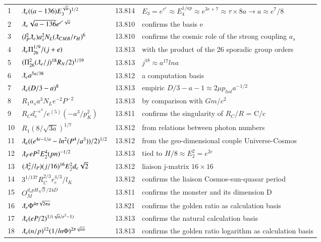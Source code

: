 \documentclass[a4paper,9pt]{article}
\begin{document}
\begin{appendix}
\begin{table}
\begin{tabular}{llll}
   1 & $\lambdabar_{e} ((a-136)E_3^{\sqrt a})^{1/2}$ & 13.814 & $E_3 = e^{e^e} \approx E_4^{1/ap} \approx e^{3e+7}\approx \tau \times 8a \rightarrow a\approx e^7/8$ \\
   2 & $ \lambdabar_{e} \sqrt{a -136} e^{e^e \sqrt a}$ & 13.810 & confirms the basis e \\
   3 & $(l_P^2 \lambdabar_{e})a_s^2 N_L (\lambdabar_{CMB}/r_H)^6$ & 13.810 & confirms the cosmic role of the strong coupling $a_s$ \\
   4 & $\lambdabar_{e} \Pi_{26}^{1/9}/(j+e)$ & 13.813 & with the product of the 26 sporadic group orders\\
   5 & $(\Pi_{26}^2(\lambdabar_e/j)^{18}R_N/2)^{1/19}$ & 13.813 & $j^{18} \approx a^{17} lna$\\
   6 & $\lambdabar_{e} a^{5a/38}$ & 13.812 & a computation basis\\
  7 & $\lambdabar_{e} (D/3 - a)^8$ & 13.813 & empiric $D/3 -a -1 \approx 2\mu p_{hol}a^{-1/2}$\\ 
   8 & $R_1 a_s a^3 N_L e^{-2}P^{-2}$ & 13.813 & by comparison with $Gm/c^2$\\
   9 & $R_C d_e^{-e^3}/e^{(5)}(-a^3/p_K^2)$ & 13.811 & confirms the singularity of $R_C/R$ = C/c\\
  10 & $R_1 (8/\sqrt{3a})^{1/7}$ & 13.812 & from relations between photon numbers \\
   11 & $\lambdabar_{e} ((e^{4e-1/a} - ln^2(P^4/a^3))/2)^{1/2}$ & 13.812 & from the geo-dimensional couple Universe-Cosmos\\
   12 & $\lambdabar_{F} e P^2E_2^4(pn)^{-1/2}$ & 13.813 &tied to $H/8 \approx E_2^2 = e^{2e}$\\
   13 & $(\lambdabar_{e}^2/l_P) (j/16)^{16}E_2^2 d_e \sqrt 2$ & 13.812 & liaison j-matrix $16 \times 16$\\
   14 & $3^{1/137} R_{C}^{2/3} r_e^{4/3} /l_K$ & 13.812 & confirms the liaison Cosmos-sun-quasar period\\
   15 & $O_M^{d_e pH\sqrt\beta / 24D}$ & 13.811 & confirms the monster and its dimension D\\
      16 & $\lambdabar_{e} \Phi ^{4\pi\sqrt{2\pi a}} $ & 13.821 & confirms the golden ratio as calculation basis\\
     17 & $\lambdabar_{e} (eP/2)^{1/(\sqrt a/e^2 - 1)} $ & 13.813 & confirms the natural calculation basis\\
    18 & $\lambdabar_{e} (n/p)^{12} (1/ln{\Phi}) ^{2\pi\sqrt{e a}} $ & 13.813 & confirms the golden ratio logarithm as calculation basis\\

\end{tabular}
\end{table}
\end{appendix}
\end{document}
